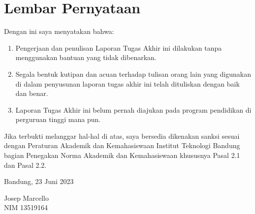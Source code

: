 \chapter*{Lembar Pernyataan}

Dengan ini saya menyatakan bahwa:

\begin{enumerate}

    \item Pengerjaan dan penulisan Laporan Tugas Akhir ini dilakukan tanpa
	menggunakan bantuan yang tidak dibenarkan.
    \item Segala bentuk kutipan dan acuan terhadap tulisan orang lain yang
	digunakan di dalam penyusunan laporan tugas akhir ini telah dituliskan
	dengan baik dan benar.
    \item Laporan Tugas Akhir ini belum pernah diajukan pada program pendidikan
	di perguruan tinggi mana pun.

\end{enumerate}

Jika terbukti melanggar hal-hal di atas, saya bersedia dikenakan sanksi sesuai
dengan Peraturan Akademik dan Kemahasiswaan Institut Teknologi Bandung bagian
Penegakan Norma Akademik dan Kemahasiswaan khususnya Pasal 2.1 dan Pasal 2.2.

\vspace{10mm}

Bandung, 23 Juni 2023

\vspace{30mm}

Josep Marcello \\
NIM 13519164
